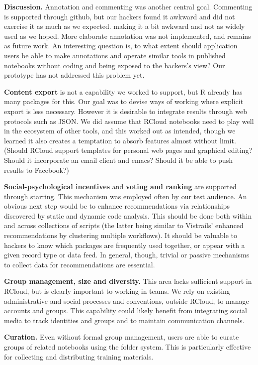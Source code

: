 {\bf Discussion.} Annotation and commenting was another central goal.
Commenting is supported through github, but our hackers found it
awkward and did not exercise it as much as we expected.
making it a bit awkward and
not as widely used as we hoped.  More elaborate annotation was not
implemented, and remains as future work.
An interesting question is, to what extent should application users
be able to make annotations and operate similar tools in published
notebooks without coding and being exposed to the hackers's view?
Our prototype has not addressed this problem yet.

{\bf Content export} is not a capability we worked to support,
but R already has many packages for this. Our goal was to devise
ways of working where explicit export is less necessary.
However it is desirable to integrate results
through web protocols such as JSON. We did assume that RCloud
notebooks need to play well in the ecosystem of other tools,
and this worked out as intended, though we learned it also creates
a temptation to absorb features almost without limit. (Should
RCloud support templates for personal web pages and graphical
editing? Should it incorporate an email client and emacs?
Should it be able to push results to Facebook?)

{\bf Social-psychological incentives} and {\bf voting and ranking}
are supported through starring. This mechanism was employed often
by our test audience. An obvious next step would be to enhance
recommendations via relationships discovered by static and
dynamic code analysis. This should be done both within and across
collections of scripts (the latter being similar to Vistrails'
enhanced recommendations by clustering multiple workflows).
It should be valuable to hackers to know which packages are
frequently used together, or appear with a given record type
or data feed. In general, though, trivial or passive mechanisms
to collect data for recommendations are essential.

{\bf Group management, size and diversity.} This area lacks sufficient
support in RCloud, but is clearly important to working in teams.
We rely on existing administrative and social processes and conventions,
outside RCloud, to manage accounts and groups. This capability
could likely benefit from integrating social media to track
identities and groups and to maintain communication channels.

{\bf Curation.} Even without formal group management, users are
able to curate groups of related notebooks using the folder
system. This is particularly effective for collecting and
distributing training materials.

